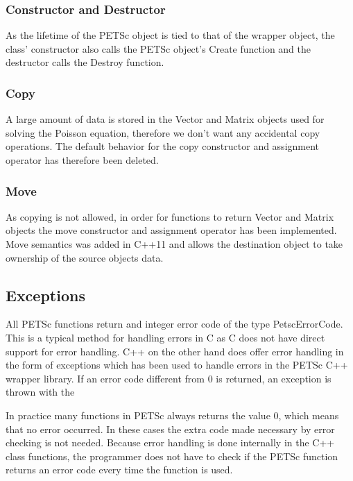 \subsubsection{Constructor and Destructor}

As the lifetime of the PETSc object is tied to that of the wrapper object,
the class' constructor also calls the PETSc object's Create function and the 
destructor calls the Destroy function. 

\subsubsection{Copy}

A large amount of data is stored in the Vector and Matrix objects used for solving the
Poisson equation, therefore we don't want any accidental copy operations.
The default behavior for the copy constructor and assignment operator has
therefore been deleted.

\subsubsection{Move}

As copying is not allowed, in order for functions to return Vector and Matrix
objects the move constructor and assignment operator has been implemented.
Move semantics was added in C++11 and allows the destination object to take
ownership of the source objects data.

\subsection{Exceptions}

All PETSc functions return and integer error code of the type PetscErrorCode.
This is a typical method for handling errors in C as C does not have direct
support for error handling. C++ on the other hand does offer error handling in
the form of exceptions which has been used to handle errors in the PETSc C++
wrapper library. If an error code different from 0 is returned, an exception
is thrown with the 

In practice many functions in PETSc always returns the value 0, which means that
no error occurred. 
In these cases the extra code made necessary by error checking is not needed.
Because error handling is done internally in the C++ class functions, the
programmer does not have to check if the PETSc function returns an error code
every time the function is used.
